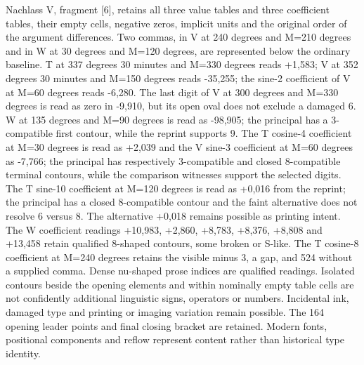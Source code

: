 Nachlass V, fragment [6], retains all three value tables and three coefficient tables, their empty cells, negative zeros, implicit units and the original order of the argument differences. Two commas, in V at 240 degrees and M=210 degrees and in W at 30 degrees and M=120 degrees, are represented below the ordinary baseline. T at 337 degrees 30 minutes and M=330 degrees reads +1,583; V at 352 degrees 30 minutes and M=150 degrees reads -35,255; the sine-2 coefficient of V at M=60 degrees reads -6,280. The last digit of V at 300 degrees and M=330 degrees is read as zero in -9,910, but its open oval does not exclude a damaged 6. W at 135 degrees and M=90 degrees is read as -98,905; the principal has a 3-compatible first contour, while the reprint supports 9. The T cosine-4 coefficient at M=30 degrees is read as +2,039 and the V sine-3 coefficient at M=60 degrees as -7,766; the principal has respectively 3-compatible and closed 8-compatible terminal contours, while the comparison witnesses support the selected digits. The T sine-10 coefficient at M=120 degrees is read as +0,016 from the reprint; the principal has a closed 8-compatible contour and the faint alternative does not resolve 6 versus 8. The alternative +0,018 remains possible as printing intent. The W coefficient readings +10,983, +2,860, +8,783, +8,376, +8,808 and +13,458 retain qualified 8-shaped contours, some broken or S-like. The T cosine-8 coefficient at M=240 degrees retains the visible minus 3, a gap, and 524 without a supplied comma. Dense nu-shaped prose indices are qualified readings. Isolated contours beside the opening elements and within nominally empty table cells are not confidently additional linguistic signs, operators or numbers. Incidental ink, damaged type and printing or imaging variation remain possible. The 164 opening leader points and final closing bracket are retained. Modern fonts, positional components and reflow represent content rather than historical type identity.

